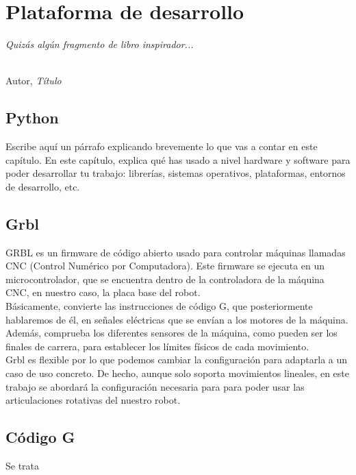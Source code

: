 \chapter{Plataforma de desarrollo}
\label{cap:capitulo3}

\begin{flushright}
\begin{minipage}[]{10cm}
\emph{Quizás algún fragmento de libro inspirador...}\\
\end{minipage}\\

Autor, \textit{Título}\\
\end{flushright}

\vspace{1cm}

\section{Python}
\label{sec:pyhton}

Escribe aquí un párrafo explicando brevemente lo que vas a contar en este capítulo. En este capítulo, explica qué has usado a nivel hardware y software para poder desarrollar tu trabajo: librerías, sistemas operativos, plataformas, entornos de desarrollo, etc.

\section{Grbl}
\label{sec:grbl}
GRBL es un firmware de código abierto usado para controlar máquinas llamadas CNC (Control Numérico por Computadora). Este firmware se ejecuta en 
un microcontrolador, que se encuentra dentro de la controladora de la máquina CNC, en nuestro caso, la placa base del robot. \\
Básicamente, convierte las instrucciones de código G, que posteriormente hablaremos de él, en señales eléctricas que se envían a los motores de la máquina. Además, 
comprueba los diferentes sensores de la máquina, como pueden ser los finales de carrera, para establecer los límites físicos de cada movimiento. \\
Grbl es flexible por lo que podemos cambiar la configuración para adaptarla a un caso de uso concreto. De hecho, aunque solo soporta movimientos lineales,
en este trabajo se abordará la configuración necesaria para para poder usar las articulaciones rotativas del nuestro robot.

\section{Código G}
\label{sec:gcode}
Se trata 

